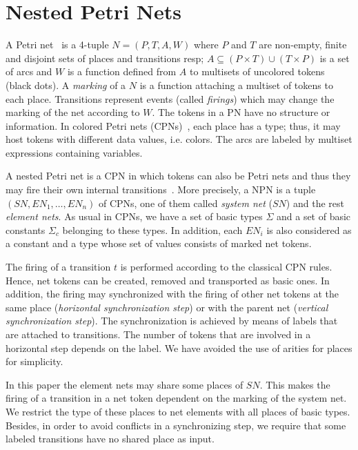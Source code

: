\documentclass{llncs}
\begin{document}
\section{Nested Petri Nets}
\label{sec:npn}

A Petri net~\cite{Murata89} is a 4-tuple $N=(P,T,A,W)$ where $P$ and $T$ are non-empty, finite and disjoint sets of places and transitions resp; $A\subseteq (P\times T)\cup (T\times P)$ is a set of arcs and $W$ is a function defined from $A$ to multisets of uncolored tokens (black dots). A \emph{marking} of a $N$ is a function attaching a multiset of tokens to each place. Transitions represent events (called \emph{firings}) which may change the marking of the net according to $W$. The tokens in a PN have no structure or information. In colored Petri nets (CPNs)~\cite{Jensen92}, each place has a type; thus, it may host tokens with different data values, i.e. colors. The arcs are labeled by multiset expressions containing variables.

A nested Petri net is a CPN in which tokens can also be Petri nets and thus they may fire their own internal transitions~\cite{Lomazova01}. More precisely, a NPN is a tuple $(SN, EN_1,\ldots, EN_n)$ of CPNs, one of them called \emph{system net} ($SN$) and the rest \emph{element nets}. As usual in CPNs, we have a set of basic types $\Sigma$ and a set of basic constants $\Sigma_c$ belonging to these types. In addition, each $EN_i$ is also considered as a constant and a type whose set of values consists of marked net tokens.

The firing of a transition $t$ is performed according to the classical CPN rules. Hence, net tokens can be created, removed and transported as basic ones. In addition,  the firing may synchronized with the firing of other net tokens at the same place (\emph{horizontal synchronization step}) or with the parent net (\emph{vertical synchronization step}). The synchronization is achieved by means of labels that are attached to transitions. The number of tokens that are involved in a horizontal step depends on the label. We have avoided the use of arities for places for simplicity. 


In this paper the element nets may share some places of $SN$. This makes the firing of a transition in a net token dependent on the marking of the system net. We restrict the type of these places to net elements with all places of basic types. Besides, in order to avoid conflicts in a synchronizing step, we require that some labeled transitions have no shared place as input.
\end{document}
